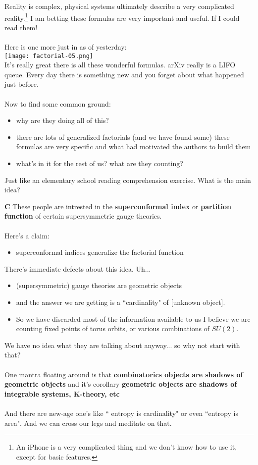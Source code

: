 \documentclass[12pt]{article}
\begin{document}
\noindent Reality is complex, physical systems ultimately describe a very complicated reality.\footnote{  An iPhone is a very complicated thing and we don't know how to use it, except for basic features.} I am betting these formulas are very important and useful.  If I could read them! \\ \\
Here is one more just in as of yesterday: \\
\texttt{[image: factorial-05.png]} \\ 
It's really great there is all these wonderful formulas.  arXiv really is a LIFO queue.  Every day there is something new and you forget about what happened just before. \\ \\
Now to find some common ground:
\begin{itemize}
\item why are they doing all of this?  
\item there are lots of generalized factorials (and we have found some) these formulas are very specific and what had motivated the authors to build them
\item what's in it for the rest of us?  what are they counting?
\end{itemize}
Just like an elementary school reading comprehension exercise.   What is the main idea?
\newpage

\noindent \textbf{C}  These people are intrested in the \textbf{superconformal index} or \textbf{partition function} of certain supersymmetric gauge theories.   \\ \\
Here's a claim:
\begin{itemize}
\item superconformal indices generalize the factorial function
\end{itemize}
There's immediate defects about this idea.  Uh...
\begin{itemize}
\item (supersymmetric) gauge theories are geometric objects
\item and the answer we are getting is a ``cardinality" of [unknown object]. 
\item So {\color{green} we have discarded most of the information available to us} I believe we are counting fixed points of torus orbits, or various combinations of $SU(2)$.
\end{itemize}    
We have no idea what they are talking about anyway... so why not start with that? \\ \\
One mantra floating around is that \textbf{combinatorics objects are shadows of geometric objects} and it's corollary \textbf{geometric objects are shadows of integrable systems, K-theory, etc}  \\ \\
And there are new-age one's like ``{\color{blue} entropy is cardinality}" or even ``{\color{blue}entropy is area}".  And we can cross our legs and meditate on that.
\end{document}
